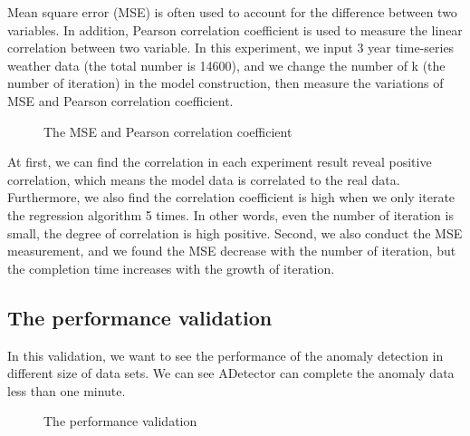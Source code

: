 \documentclass{vgtc}                          %
\begin{document}
Mean square error (MSE) is often used to account for the difference between two variables. In addition, Pearson correlation coefficient is used to measure the linear correlation between two variable. In this experiment, we input 3 year time-series weather data (the total number is 14600), and we change the number of k (the number of iteration) in the model construction, then measure the variations of MSE and Pearson correlation coefficient. 
\begin{figure}[htb]
	\caption{The MSE and Pearson correlation coefficient}
\end{figure}

At first, we can find the correlation in each experiment result reveal positive correlation, which means the model data is correlated to the real data. Furthermore, we also find the correlation coefficient is high when we only iterate the regression algorithm 5 times. In other words, even the number of iteration is small, the degree of correlation is high positive. Second, we also conduct the MSE measurement, and we found the MSE decrease with the number of iteration, but the completion time increases with the growth of iteration.
	
\subsection{The performance validation}
In this validation, we want to see the performance of the anomaly detection in different size of data sets. We can see ADetector can complete the anomaly data less than one minute. 

\begin{figure}[htb]
\begin{center}
\end{center}
	\caption{The performance validation}
\end{figure} 
\end{document}
